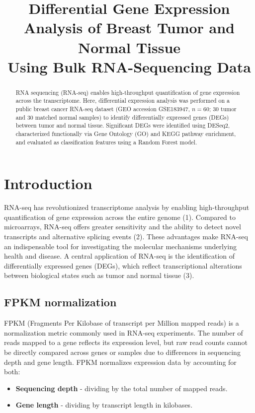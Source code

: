 \documentclass[12pt]{article}
\title{Differential Gene Expression Analysis of Breast Tumor and Normal Tissue \\
Using Bulk RNA-Sequencing Data}
\date{}
\begin{document}
\maketitle

\begin{abstract}
\noindent RNA sequencing (RNA-seq) enables high-throughput quantification of gene
expression across the transcriptome. Here, differential expression analysis was
performed on a public breast cancer RNA-seq dataset (GEO accession GSE183947,
$n=60$; 30 tumor and 30 matched normal samples) to identify differentially
expressed genes (DEGs) between tumor and normal tissue. Significant DEGs were
identified using DESeq2, characterized functionally via Gene Ontology (GO) and
KEGG pathway enrichment, and evaluated as classification features using a
Random Forest model.
\end{abstract}

\section{Introduction}
RNA-seq has revolutionized transcriptome analysis by enabling high-throughput quantification of gene expression across the entire genome (1). Compared to microarrays, RNA-seq offers greater sensitivity and the ability to detect novel transcripts and alternative splicing events (2). These advantages make RNA-seq an indispensable tool for investigating the molecular mechanisms underlying health and disease.
A central application of RNA-seq is the identification of differentially expressed genes (DEGs), which reflect transcriptional alterations between biological states such as tumor and normal tissue (3).

\subsection{FPKM normalization}
FPKM (Fragments Per Kilobase of transcript per Million mapped reads) is a
normalization metric commonly used in RNA-seq experiments. The number of reads
mapped to a gene reflects its expression level, but raw read counts cannot be
directly compared across genes or samples due to differences in sequencing
depth and gene length. FPKM normalizes expression data by accounting for both:
\begin{itemize}
  \item \textbf{Sequencing depth} - dividing by the total number of mapped reads.
  \item \textbf{Gene length} - dividing by transcript length in kilobases.
\end{itemize}
\end{document}
